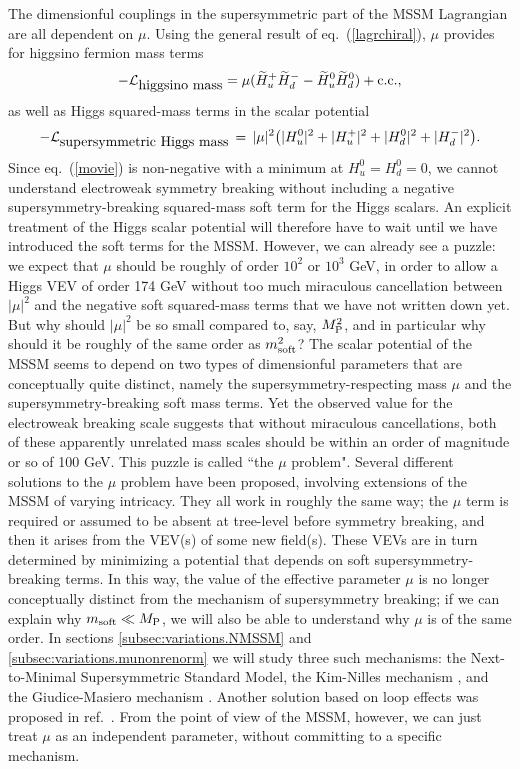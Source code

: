 \documentclass[12pt]{article}
\def\beq{\begin{eqnarray}}
\def\eeq{\end{eqnarray}}
\def\stilde{\widetilde}
\def\lagr{{\cal L}}
\def\conj{{{\rm c.c.}}}
\def\MPlanck{M_{\rm P}}
\begin{document}
The dimensionful couplings in the supersymmetric part of the MSSM
Lagrangian are all dependent on $\mu$. Using the general result of
eq.~(\ref{lagrchiral}), $\mu$ provides for higgsino fermion
mass terms
\beq
-\lagr_{\mbox{higgsino mass}}= \mu (\stilde H_u^+ \stilde H_d^- - \stilde 
H_u^0 \stilde
H_d^0)+ \conj,
\label{poody}
\eeq
as well as Higgs squared-mass terms in the scalar potential
\beq
-\lagr_{\mbox{supersymmetric Higgs mass}} \,=\, |\mu|^2 
\bigl 
(
|H_u^0|^2 + |H_u^+|^2 + |H_d^0|^2 + |H_d^-|^2 \bigr ).
\label{movie}
\eeq
Since eq.~(\ref{movie}) is non-negative with a minimum at
$H_u^0 = H_d^0 = 0$, we cannot understand
electroweak symmetry breaking without including a negative
supersymmetry-breaking squared-mass soft term for the Higgs scalars. An
explicit treatment of the Higgs scalar potential will therefore have to
wait until we have introduced the soft terms for the MSSM. However, we can
already see a puzzle: we expect that $\mu$ should be roughly of order
$10^2$ or $10^3$ GeV, in order to allow a Higgs VEV of order 174 GeV
without too much miraculous cancellation between $|\mu|^2$ and the
negative soft squared-mass terms that we have not written down yet. But
why should $|\mu|^2$ be so small compared to, say, $\MPlanck^2$, and in
particular why should it be roughly of the same order as $m^2_{\rm soft}$?
The scalar potential of the MSSM seems to depend on two types of
dimensionful parameters that are conceptually quite distinct, namely the
supersymmetry-respecting mass $\mu$ and the supersymmetry-breaking soft
mass terms. Yet the observed value for the electroweak breaking scale
suggests that without miraculous cancellations, both of these apparently
unrelated mass scales should be within an order of magnitude or so of 100
GeV. This puzzle is called ``the $\mu$ problem". Several different
solutions to the $\mu$ problem have been proposed, involving extensions of
the MSSM of varying intricacy. They all work in roughly the same way; the
$\mu$ term is required or assumed to be absent at tree-level before
symmetry breaking, and then it arises from the VEV(s) of some new
field(s). These VEVs are in turn determined by minimizing a potential that
depends on soft supersymmetry-breaking terms. In this way, the value of
the effective parameter $\mu$ is no longer conceptually distinct from the
mechanism of supersymmetry breaking; if we can explain why $m_{\rm soft}
\ll \MPlanck$, we will also be able to understand why $\mu$ is of the same
order. In sections \ref{subsec:variations.NMSSM} and
\ref{subsec:variations.munonrenorm}
we will study three such
mechanisms: the Next-to-Minimal Supersymmetric Standard Model, the Kim-Nilles mechanism 
\cite{KimNilles}, and the Giudice-Masiero 
mechanism \cite{GiudiceMasiero}. 
Another solution based on loop effects was
proposed in ref.~\cite{muproblemGMSB}. 
From the point of view of the MSSM, however, 
we can just treat $\mu$ as an independent parameter, without
committing to a specific mechanism. 
\end{document}
